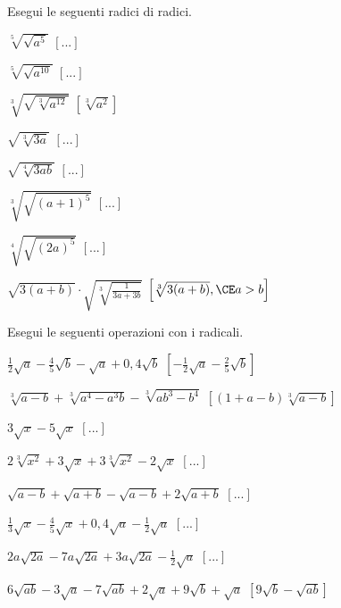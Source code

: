 \begin{esercizio}[*]
\label{ese:2.48}
Esegui le seguenti radici di radici.
\begin{htmulticols}{3}
\begin{enumeratea}
\item \(\sqrt[5]{\sqrt{a^5}}\)
\hfill \(\left[...\right]\)
\item \(\sqrt[5]{\sqrt{a^{10}}}\)
\hfill \(\left[...\right]\)
\item \(\sqrt[3]{\sqrt{\sqrt[3]{a^{12}}}}\)
\hfill \(\left[\sqrt[3]{a^2}\right]\)
\item \(\sqrt{\sqrt[3]{3a}}\)
\hfill \(\left[...\right]\)
\item \(\sqrt{\sqrt[4]{3ab}}\)
\hfill \(\left[...\right]\)
\item \(\sqrt[3]{\sqrt{(a+1)^5}}\)
\hfill \(\left[...\right]\)
\item \(\sqrt[4]{\sqrt{(2a)^5}}\)
\hfill \(\left[...\right]\)
\item \(\sqrt{3(a+b)}\cdot \sqrt{\sqrt[3]{\frac 1{3a+3b}}}\)
\hfill \(\left[\sqrt[3]{3(a+b)}, \CE a>b\right]\)
\end{enumeratea}
\end{htmulticols}
\end{esercizio}

\begin{esercizio}[*]
\label{ese:2.52}
Esegui le seguenti operazioni con i radicali.
\begin{enumeratea}
\item \(\frac 1 2\sqrt a-\frac 4 5\sqrt b-\sqrt a+0,4\sqrt b\)
\hfill \(\left[-\frac 1 2\sqrt a-\frac 2 5\sqrt b\right]\)
\item \(\sqrt[3]{a-b}+\sqrt[3]{a^4-a^3b}-\sqrt[3]{{ab}^3-b^4}\)
\hfill \(\left[(1+a-b)\sqrt[3]{a-b}\right]\)
\item \(3\sqrt x-5\sqrt x\)
\hfill \(\left[...\right]\)
\item \(2\sqrt[3]{x^2}+3\sqrt x+3\sqrt[3]{x^2}-2\sqrt x\)
\hfill \(\left[...\right]\)
\item \(\sqrt{a-b}+\sqrt{a+b}-\sqrt{a-b}+2\sqrt{a+b}\)
\hfill \(\left[...\right]\)
\item \(\frac 1 3\sqrt x-\frac 4 5\sqrt x+0,4\sqrt a-\frac 1 2\sqrt a\)
\hfill \(\left[...\right]\)
\item \(2a\sqrt{2a}-7a\sqrt{2a}+3a\sqrt{2a}-\frac 1 2\sqrt a\)
\hfill \(\left[...\right]\)
\item \(6\sqrt{{ab}}-3\sqrt a-7\sqrt{{ab}}+2\sqrt a+9\sqrt b+\sqrt a\)
\hfill \(\left[9\sqrt b-\sqrt{ab}\right]\)
\end{enumeratea}
\end{esercizio}

